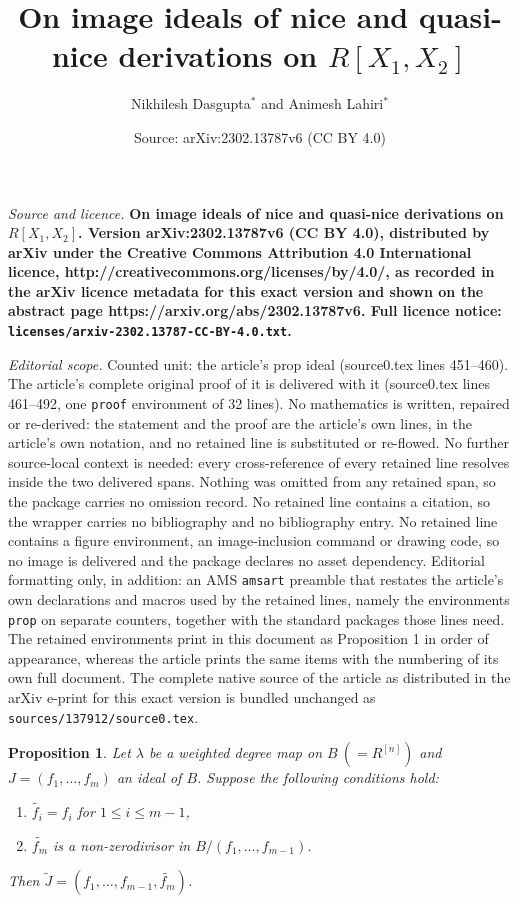 \documentclass[10pt,a4paper]{amsart}
\title{\bf On image ideals of nice and quasi-nice derivations on $R[X_1,X_2]$}
\author{Nikhilesh Dasgupta$^{*}$ and Animesh Lahiri$^{*}$}
\date{Source: arXiv:2302.13787v6 (CC BY 4.0)}
\newtheorem{prop}{Proposition}
\begin{document}
\maketitle

\noindent\emph{Source and licence.} \bf On image ideals of nice and quasi-nice derivations on $R[X_1,X_2]$. Version arXiv:2302.13787v6 (CC BY 4.0), distributed by arXiv under the Creative Commons Attribution 4.0 International licence, http://creativecommons.org/licenses/by/4.0/, as recorded in the arXiv licence metadata for this exact version and shown on the abstract page https://arxiv.org/abs/2302.13787v6. Full licence notice: \texttt{licenses/arxiv-2302.13787-CC-BY-4.0.txt}.\par\smallskip

\noindent\textit{Editorial scope.} Counted unit: the article's prop ideal (source0.tex lines 451--460). The article's complete original proof of it is delivered with it (source0.tex lines 461--492, one \texttt{proof} environment of 32 lines). No mathematics is written, repaired or re-derived: the statement and the proof are the article's own lines, in the article's own notation, and no retained line is substituted or re-flowed.  No further source-local context is needed: every cross-reference of every retained line resolves inside the two delivered spans.  Nothing was omitted from any retained span, so the package carries no omission record.  No retained line contains a citation, so the wrapper carries no bibliography and no bibliography entry.  No retained line contains a figure environment, an image-inclusion command or drawing code, so no image is delivered and the package declares no asset dependency.  Editorial formatting only, in addition: an AMS \texttt{amsart} preamble that restates the article's own declarations and macros used by the retained lines, namely the environments \texttt{prop} on separate counters, together with the standard packages those lines need.  The retained environments print in this document as Proposition 1 in order of appearance, whereas the article prints the same items with the numbering of its own full document.  The complete native source of the article as distributed in the arXiv e-print for this exact version is bundled unchanged as \texttt{sources/137912/source0.tex}.
\begin{prop}\label{top degree ideal}
Let $\lambda$ be a weighted degree map on $B~(=R^{[n]})$ and $J=(f_1,\dots,f_m)$ an ideal of $B$. Suppose the following conditions hold:
\begin{enumerate}
	\item [\rm(i)]$\widetilde{f_i}=f_i$ for $1\leqslant i\leqslant m-1$,
	\item[\rm(ii)] $\widetilde{f_m}$ is a non-zerodivisor in $B/(f_1,\dots,f_{m-1})$.
\end{enumerate}

\noindent
Then $\widetilde{J}=(f_1,\dots,f_{m-1}, \widetilde{f_m})$.
\end{prop}
\end{document}
